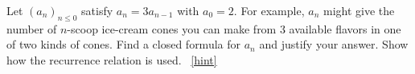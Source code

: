 \documentclass{book}
\begin{document}
\setcounter{project}{144}
\addtocounter{project}{-1}
\begin{activity}[]\label{act-geometric}
\hypertarget{p-965}{}%
Let \((a_n)_{n \le 0}\) satisfy \(a_n = 3a_{n-1}\) with \(a_0 = 2\).  For example, \(a_n\) might give the number of \(n\)-scoop ice-cream cones you can make from 3 available flavors in one of two kinds of cones.  Find a closed formula for \(a_n\) and justify your answer.  Show how the recurrence relation is used.%
~\hfill{\tiny\hyperlink{a-144}{[hint]}\hypertarget{q-144}{}}\end{activity}
\end{document}
